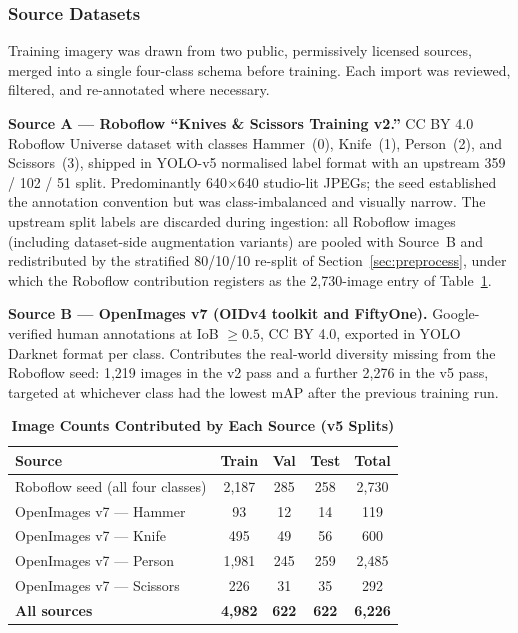 \documentclass{ieeeaccess}
\begin{document}
\subsubsection{Source Datasets}
\label{sec:sources}
Training imagery was drawn from two public, permissively licensed sources, merged into a single four-class schema before training. Each import was reviewed, filtered, and re-annotated where necessary.

\textbf{Source A --- Roboflow ``Knives \& Scissors Training v2.''} CC BY 4.0 Roboflow Universe dataset with classes Hammer~(0), Knife~(1), Person~(2), and Scissors~(3), shipped in YOLO-v5 normalised label format with an upstream 359 / 102 / 51 split. Predominantly 640$\times$640 studio-lit JPEGs; the seed established the annotation convention but was class-imbalanced and visually narrow. The upstream split labels are discarded during ingestion: all Roboflow images (including dataset-side augmentation variants) are pooled with Source~B and redistributed by the stratified 80/10/10 re-split of Section~\ref{sec:preprocess}, under which the Roboflow contribution registers as the 2{,}730-image entry of Table~\ref{tab:sources}.

\textbf{Source B --- OpenImages v7 (OIDv4 toolkit and FiftyOne).} Google-verified human annotations at IoB $\geq 0.5$, CC BY 4.0, exported in YOLO Darknet format per class. Contributes the real-world diversity missing from the Roboflow seed: 1{,}219 images in the v2 pass and a further 2{,}276 in the v5 pass, targeted at whichever class had the lowest mAP after the previous training run.

\begin{table}[ht!]
\caption{\textbf{Image Counts Contributed by Each Source (v5 Splits)}}
\label{tab:sources}
\setlength{\tabcolsep}{3pt}
\centering\small
\begin{tabular}{|l|c|c|c|c|}
\hline
\textbf{Source} & \textbf{Train} & \textbf{Val} & \textbf{Test} & \textbf{Total} \\
\hline
Roboflow seed (all four classes)     & 2{,}187 & 285 & 258 & 2{,}730 \\
OpenImages v7 --- Hammer             & 93      & 12  & 14  & 119   \\
OpenImages v7 --- Knife              & 495     & 49  & 56  & 600   \\
OpenImages v7 --- Person             & 1{,}981 & 245 & 259 & 2{,}485 \\
OpenImages v7 --- Scissors           & 226     & 31  & 35  & 292   \\
\hline
\textbf{All sources}                 & \textbf{4{,}982} & \textbf{622} & \textbf{622} & \textbf{6{,}226} \\
\hline
\end{tabular}
\end{table}
\end{document}
